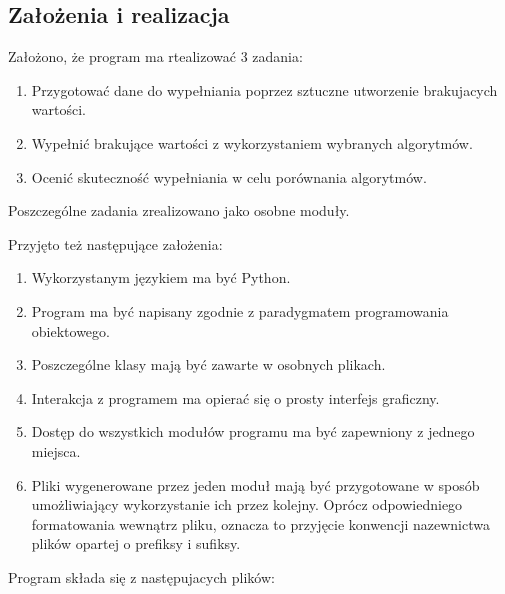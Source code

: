 \documentclass[12pt,twoside]{article}
\begin{document}
\subsection{Założenia i realizacja}
Założono, że program ma rtealizować 3 zadania:

\begin{enumerate}[label=\arabic*), leftmargin=1.25cm]
    \item Przygotować dane do wypełniania poprzez sztuczne utworzenie brakujacych wartości.
    \item Wypełnić brakujące wartości z wykorzystaniem wybranych algorytmów.
    \item Ocenić skuteczność wypełniania w celu porównania algorytmów.
\end{enumerate}

Poszczególne zadania zrealizowano jako osobne moduły.

Przyjęto też następujące założenia:

\begin{enumerate}[label=\arabic*), leftmargin=1.25cm]
    \item Wykorzystanym językiem ma być Python.
    \item Program ma być napisany zgodnie z paradygmatem programowania obiektowego.
    \item Poszczególne klasy mają być zawarte w osobnych plikach.
    \item Interakcja z programem ma opierać się o prosty interfejs graficzny.
    \item Dostęp do wszystkich modułów programu ma być zapewniony z jednego miejsca.
    \item Pliki wygenerowane przez jeden moduł mają być przygotowane w sposób umożliwiający
    wykorzystanie ich przez kolejny. Oprócz odpowiedniego formatowania wewnątrz pliku,
    oznacza to przyjęcie konwencji nazewnictwa plików opartej o prefiksy i sufiksy.
\end{enumerate}

Program składa się z następujacych plików:
\end{document}

